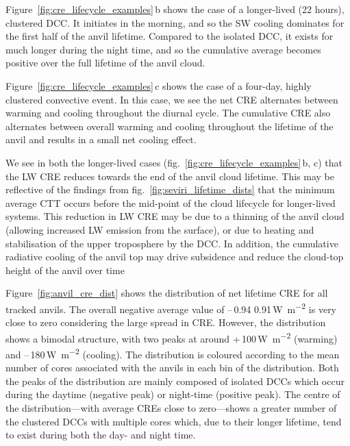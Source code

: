 \documentclass[acp, manuscript]{copernicus}
\begin{document}
Figure~\ref{fig:cre_lifecycle_examples}\,b shows the case of a longer-lived (22 hours), clustered DCC. 
It initiates in the morning, and so the SW cooling dominates for the first half of the anvil lifetime. 
Compared to the isolated DCC, it exists for much longer during the night time, and so the cumulative average becomes positive over the full lifetime of the anvil cloud.

Figure~\ref{fig:cre_lifecycle_examples}\,c shows the case of a four-day, highly clustered convective event. 
In this case, we see the net CRE alternates between warming and cooling throughout the diurnal cycle. 
The cumulative CRE also alternates between overall warming and cooling throughout the lifetime of the anvil and results in a small net cooling effect.

We see in both the longer-lived cases (fig.~\ref{fig:cre_lifecycle_examples}\,b, c) that the LW CRE reduces towards the end of the anvil cloud lifetime. 
This may be reflective of the findings from fig.~\ref{fig:seviri_lifetime_dists} that the minimum average CTT occurs before the mid-point of the cloud lifecycle for longer-lived systems. 
This reduction in LW CRE may be due to a thinning of the anvil cloud (allowing increased LW emission from the surface), or due to heating and stabilisation of the upper troposphere by the DCC.
In addition, the cumulative radiative cooling of the anvil top may drive subsidence and reduce the cloud-top height of the anvil over time \citep{sokol_tropical_2020}

Figure~\ref{fig:anvil_cre_dist} shows the distribution of net lifetime CRE for all tracked anvils. 
The overall negative average value of --\,0.94\,\textpm\,0.91\,\unit{W m^{-2}} is very close to zero considering the large spread in CRE. 
However, the distribution shows a bimodal structure, with two peaks at around +\,100\,\unit{W m^{-2}} (warming) and --\,180\,\unit{W m^{-2}} (cooling). 
The distribution is coloured according to the mean number of cores associated with the anvils in each bin of the distribution. 
Both the peaks of the distribution are mainly composed of isolated DCCs which occur during the daytime (negative peak) or night-time (positive peak). 
The centre of the distribution---with average CREs close to zero---shows a greater number of the clustered DCCs with multiple cores which, due to their longer lifetime, tend to exist during both the day- and night time.
\end{document}
